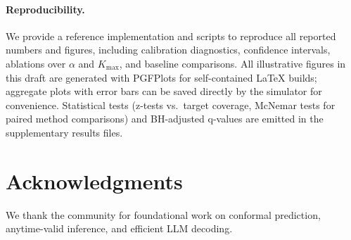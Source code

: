 \documentclass[11pt]{article}
\begin{document}
\paragraph{Reproducibility.}
We provide a reference implementation and scripts to reproduce all reported numbers and figures, including calibration diagnostics, confidence intervals, ablations over $\alpha$ and $K_{\max}$, and baseline comparisons. All illustrative figures in this draft are generated with PGFPlots for self-contained LaTeX builds; aggregate plots with error bars can be saved directly by the simulator for convenience. Statistical tests (z-tests vs.\ target coverage, McNemar tests for paired method comparisons) and BH-adjusted q-values are emitted in the supplementary results files.

\section*{Acknowledgments}
We thank the community for foundational work on conformal prediction, anytime-valid inference, and efficient LLM decoding.
\end{document}
